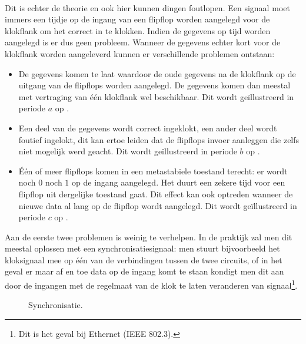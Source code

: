 \paragraph{}
Dit is echter de theorie en ook hier kunnen dingen foutlopen. Een signaal moet immers een tijdje op de ingang van een flipflop worden aangelegd voor de klokflank om het correct in te klokken. Indien de gegevens op tijd worden aangelegd is er dus geen probleem. Wanneer de gegevens echter kort voor de klokflank worden aangeleverd kunnen er verschillende problemen ontstaan:
\begin{itemize}
 \item De gegevens komen te laat waardoor de oude gegevens na de klokflank op de uitgang van de flipflops worden aangelegd. De gegevens komen dan meestal met vertraging van \'e\'en klokflank wel beschikbaar. Dit wordt ge\"illustreerd in periode $a$ op .
 \item Een deel van de gegevens wordt correct ingeklokt, een ander deel wordt foutief ingelokt, dit kan ertoe leiden dat de flipflops invoer aanleggen die zelfs niet mogelijk werd geacht. Dit wordt ge\"illustreerd in periode $b$ op .
 \item \'E\'en of meer flipflops komen in een metastabiele toestand terecht: er wordt noch $0$ noch $1$ op de ingang aangelegd. Het duurt een zekere tijd voor een flipflop uit dergelijke toestand gaat. Dit effect kan ook optreden wanneer de nieuwe data al lang op de flipflop wordt aangelegd. Dit wordt ge\"illustreerd in periode $c$ op .
\end{itemize}
Aan de eerste twee problemen is weinig te verhelpen. In de praktijk zal men dit meestal oplossen met een synchronisatiesignaal: men stuurt bijvoorbeeld het kloksignaal mee op \'e\'en van de verbindingen tussen de twee circuits, of in het geval er maar af en toe data op de ingang komt te staan kondigt men dit aan door de ingangen met de regelmaat van de klok te laten veranderen van signaal\footnote{Dit is het geval bij Ethernet (IEEE 802.3).}.
\begin{figure}[hbt]
\centering
{}
\caption{Synchronisatie.}
\end{figure}
